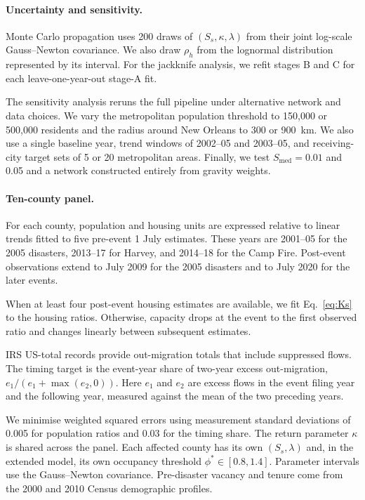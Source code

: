 \documentclass[11pt]{article}
\begin{document}
\paragraph{Uncertainty and sensitivity.} Monte Carlo propagation uses 200 draws of $(S_s,\kappa,\lambda)$ from their joint log-scale Gauss--Newton covariance. We also draw $\rho_h$ from the lognormal distribution represented by its interval. For the jackknife analysis, we refit stages B and C for each leave-one-year-out stage-A fit.

The sensitivity analysis reruns the full pipeline under alternative network and data choices. We vary the metropolitan population threshold to 150{,}000 or 500{,}000 residents and the radius around New Orleans to 300 or 900~km. We also use a single baseline year, trend windows of 2002--05 and 2003--05, and receiving-city target sets of 5 or 20 metropolitan areas. Finally, we test $S_{\text{med}}=0.01$ and 0.05 and a network constructed entirely from gravity weights.

\paragraph{Ten-county panel.} For each county, population and housing units are expressed relative to linear trends fitted to five pre-event 1 July estimates. These years are 2001--05 for the 2005 disasters, 2013--17 for Harvey, and 2014--18 for the Camp Fire. Post-event observations extend to July 2009 for the 2005 disasters and to July 2020 for the later events.

When at least four post-event housing estimates are available, we fit Eq.~\eqref{eq:Ks} to the housing ratios. Otherwise, capacity drops at the event to the first observed ratio and changes linearly between subsequent estimates.

IRS US-total records provide out-migration totals that include suppressed flows. The timing target is the event-year share of two-year excess out-migration, $e_1/(e_1+\max(e_2,0))$. Here $e_1$ and $e_2$ are excess flows in the event filing year and the following year, measured against the mean of the two preceding years.

We minimise weighted squared errors using measurement standard deviations of 0.005 for population ratios and 0.03 for the timing share. The return parameter $\kappa$ is shared across the panel. Each affected county has its own $(S_s,\lambda)$ and, in the extended model, its own occupancy threshold $\phi^*\in[0.8,1.4]$. Parameter intervals use the Gauss--Newton covariance. Pre-disaster vacancy and tenure come from the 2000 and 2010 Census demographic profiles.
\end{document}
